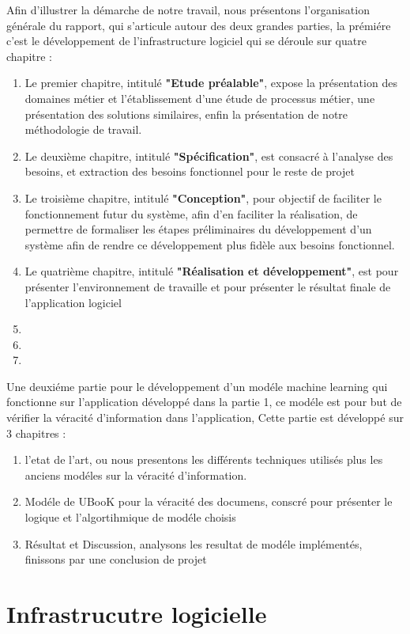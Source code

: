 \documentclass[12pt]{report}
\begin{document}
\normalsize{
Afin d’illustrer la démarche de notre travail, nous présentons l’organisation générale
du rapport, qui s’articule autour des deux grandes parties, la prémiére c'est le développement de l'infrastructure logiciel qui se déroule sur quatre chapitre : 
\begin{enumerate}
\item Le premier chapitre, intitulé \textbf{"Etude préalable"}, expose la présentation des
domaines métier et l’établissement d’une étude de processus métier, une présentation
des solutions similaires, enfin la présentation de notre méthodologie de travail.
\item Le deuxième chapitre, intitulé \textbf{"Spécification"}, est consacré à l'analyse des besoins, et extraction des besoins fonctionnel pour le reste de projet
\item Le troisième chapitre, intitulé \textbf{"Conception"},  pour objectif de faciliter le fonctionnement futur du système, afin d'en faciliter la réalisation, de permettre de formaliser les étapes préliminaires du développement d'un système afin de rendre ce développement plus fidèle aux besoins fonctionnel. 
\item Le quatrième chapitre, intitulé \textbf{"Réalisation et développement"}, est pour présenter l'environnement de travaille et pour présenter le résultat finale de l'application logiciel
\item[]
\item[]
\item[]
\end{enumerate}
Une deuxiéme partie pour le développement d'un modéle machine learning qui fonctionne sur l'application développé dans la partie 1, ce modéle est pour but de vérifier la véracité d'information dans l'application, Cette partie est développé sur 3 chapitres : 
\begin{enumerate}
\item l'etat de l'art, ou nous presentons les différents techniques utilisés plus les anciens modéles sur la véracité d'information.
\item Modéle de UBooK pour la véracité des documens, conscré pour présenter le logique et l'algortihmique de modéle choisis
\item Résultat et Discussion, analysons les resultat de modéle implémentés, finissons par une conclusion de projet
\end{enumerate}

}

\part*{Infrastrucutre logicielle}
\end{document}
